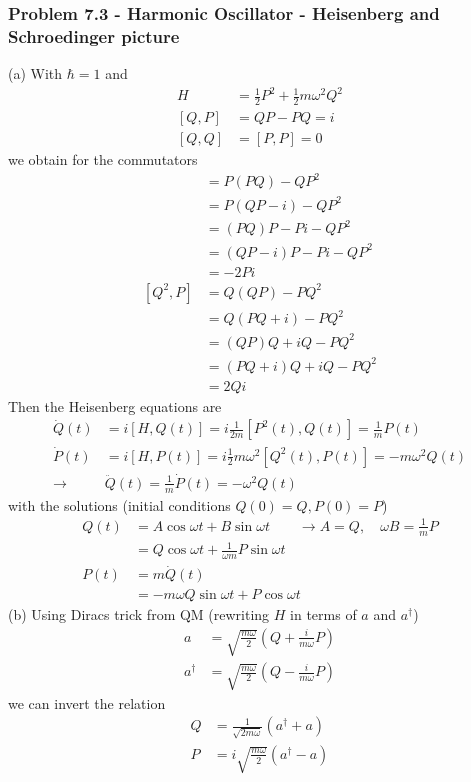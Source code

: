 \documentclass[10pt,a4paper]{article}
\theoremstyle{definition}
\begin{document}
\subsubsection{Problem 7.3 - Harmonic Oscillator  - Heisenberg and Schroedinger picture}
(a) With $\hbar=1$ and
\begin{align}
H&=\frac{1}{2}P^2+\frac{1}{2}m\omega^2Q^2\\
[Q,P]&=QP-PQ=i\\
[Q,Q]&=[P,P]=0
\end{align}
we obtain for the commutators
\begin{align}
[P^2,Q]
&=P(PQ)-QP^2\\
&=P(QP-i)-QP^2\\
&=(PQ)P-Pi-QP^2\\
&=(QP-i)P-Pi-QP^2\\
&=-2Pi\\
[Q^2,P]
&=Q(QP)-PQ^2\\
&=Q(PQ+i)-PQ^2\\
&=(QP)Q+iQ-PQ^2\\
&=(PQ+i)Q+iQ-PQ^2\\
&=2Qi
\end{align}
Then the Heisenberg equations are
\begin{align}
\dot Q(t)&=i[H,Q(t)]=i\frac{1}{2m}[P^2(t),Q(t)]=\frac{1}{m}P(t)\\
\dot P(t)&=i[H,P(t)]=i\frac{1}{2}m\omega^2[Q^2(t),P(t)]=-m\omega^2Q(t)\\
\rightarrow &\ddot Q(t)=\frac{1}{m}\dot P(t)=-\omega^2 Q(t)
\end{align}
with the solutions (initial conditions $Q(0)=Q, P(0)=P$)
\begin{align}
Q(t)&=A\cos\omega t+B\sin\omega t\qquad\rightarrow A=Q,\quad\omega B=\frac{1}{m}P\\
&=Q\cos\omega t+\frac{1}{\omega m}P\sin\omega t\\
P(t)&=m\dot Q(t)\\
&=-m\omega Q\sin\omega t+P\cos\omega t
\end{align}
(b) Using Diracs trick from QM (rewriting $H$ in terms of $a$ and $a^\dagger$)
\begin{align}
a&=\sqrt{\frac{m\omega}{2}}(Q+\frac{i}{m\omega}P)\\
a^\dagger&=\sqrt{\frac{m\omega}{2}}(Q-\frac{i}{m\omega}P)
\end{align}
we can invert the relation
\begin{align}
Q&=\frac{1}{\sqrt{2m\omega}}(a^\dagger+a)\\
P&=i\sqrt{\frac{m\omega}{2}}(a^\dagger-a)
\end{align}
\end{document}
